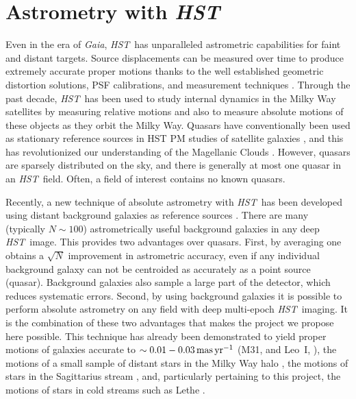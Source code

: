 \documentclass[12pt]{article}
\newcommand{\hst}{\textsl{HST}}
\newcommand{\gaia}{\textsl{Gaia}}
\begin{document}
\section*{Astrometry with \hst}
Even in the era of \gaia, \hst\ has unparalleled astrometric capabilities for faint and distant targets.
Source displacements can be measured over time to produce extremely accurate proper motions thanks to the well established geometric distortion solutions, PSF calibrations, and measurement techniques \parencite[e.g.,][]{anderson2003}.
Through the past decade, \hst\ has been used to study internal dynamics in the Milky Way satellites by measuring relative motions \parencite[e.g., ][]{anderson2010} and also to measure absolute motions of these objects as they orbit the Milky Way.
Quasars have conventionally been used as stationary reference sources in HST PM studies of satellite galaxies \parencite[e.g.,][]{kallivayalil2006, kallivayalil2013, piatek2008}, and this has revolutionized our understanding of the Magellanic Clouds \parencite{besla2007}.
However, quasars are sparsely distributed on the sky, and there is generally at most one quasar in an \hst\ field.
Often, a field of interest contains no known quasars.

Recently, a new technique of absolute astrometry with \hst\ has been developed using distant background galaxies as reference sources \parencite[e.g.,][]{mahmud2008, sohn2012,sohn2013}.
There are many (typically $N\sim100$) astrometrically useful background galaxies in any deep \hst\ image.
This provides two advantages over quasars.
First, by averaging one obtains a $\sqrt{N}$ improvement in astrometric accuracy, even if any individual background galaxy can not be centroided as accurately as a point source (quasar).
Background galaxies also sample a large part of the detector, which reduces systematic errors.
Second, by using background galaxies it is possible to perform absolute astrometry on any field with deep multi-epoch \hst\ imaging.
It is the combination of these two advantages that makes the project we propose here possible.
This technique has already been demonstrated to yield proper motions of galaxies accurate to $\sim0.01-0.03\,\rm mas\,yr^{-1}$ (M31, \cite{sohn2012,vdmarel2012a,vdmarel2012b} and Leo~I, \cite{sohn2013}), the motions of a small sample of distant stars in the Milky Way halo \parencite{deason2013}, the motions of stars in the Sagittarius stream \parencite{sohn2015}, and, particularly pertaining to this project, the motions of stars in cold streams such as Lethe \parencite[Figure~\ref{fig:lethe},][]{sohn2016}.
\end{document}
